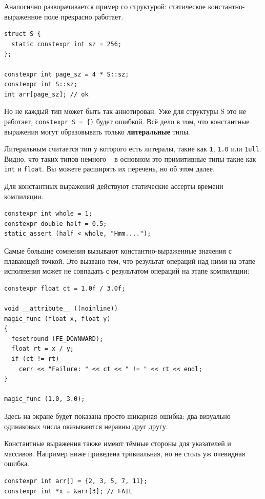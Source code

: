 \documentclass[a4paper,12pt,oneside]{article}
\begin{document}
Аналогично разворачивается пример со структурой: статическое константно-выраженное поле прекрасно работает.

\begin{lstlisting}
struct S { 
  static constexpr int sz = 256; 
};

constexpr int page_sz = 4 * S::sz;
constexpr int S::sz;
int arr[page_sz]; // ok
\end{lstlisting}

Но не каждый тип может быть так аннотирован. Уже для структуры S это не работает, \lstinline!constexpr S = {}! будет ошибкой. Всё дело в том, что константные выражения могут образовывать только \textbf{литеральные} типы.

Литеральным считается тип у которого есть литералы, такие как \lstinline!1!, \lstinline!1.0! или \lstinline!1ull!. Видно, что таких типов немного -- в основном это примитивные типы такие как \lstinline!int! и \lstinline!float!. Вы можете расширять их перечень, но об этом далее.

Для константных выражений действуют статические ассерты времени компиляции.

\begin{lstlisting}
constexpr int whole = 1; 
constexpr double half = 0.5;
static_assert (half < whole, "Hmm....");
\end{lstlisting}

Самые большие сомнения вызывают константно-выраженные значения с плавающей точкой. Это вызвано тем, что результат операций над ними на этапе исполнения может не совпадать с результатом операций на этапе компиляции:

\begin{lstlisting}
constexpr float ct = 1.0f / 3.0f;

void __attribute__ ((noinline))
magic_func (float x, float y)
{
  fesetround (FE_DOWNWARD);
  float rt = x / y;
  if (ct != rt) 
    cerr << "Failure: " << ct << " != " << rt << endl;  
}

magic_func (1.0, 3.0);
\end{lstlisting}

Здесь на экране будет показана просто шикарная ошибка: два визуально одинаковых числа оказываются неравны друг другу.

Константные выражения также имеют тёмные стороны для указателей и массивов. Например ниже приведена тривиальная, но не столь уж очевидная ошибка.

\begin{lstlisting}
constexpr int arr[] = {2, 3, 5, 7, 11};
constexpr int *x = &arr[3]; // FAIL
\end{lstlisting}
\end{document}
